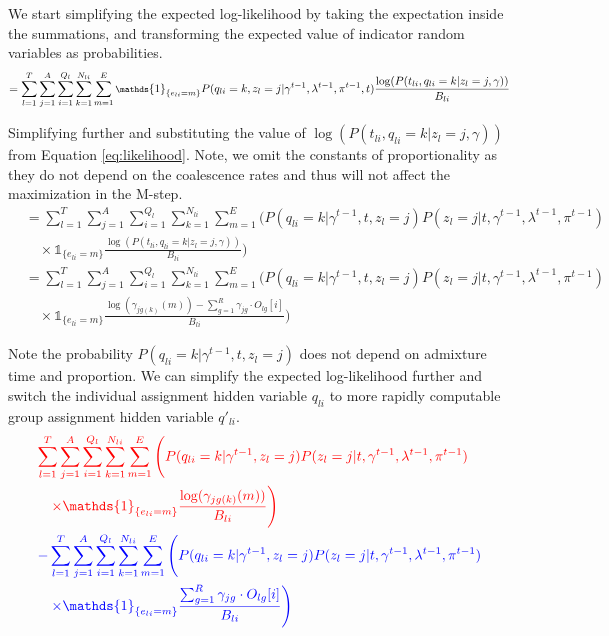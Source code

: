 We start simplifying the expected log-likelihood by taking the expectation inside the summations, and transforming the expected value of indicator random variables as probabilities.  
\begin{equation}
    \footnotesize
    = \sum_{l = 1}^T \sum_{j = 1}^A  \sum_{i = 1}^{Q_l} \sum_{k =1}^{N_{li}} \sum_{m = 1}^E \mathds{1}_{\{e_{l i} = m\}} P(q_{li} = k, z_l = j \vert \gamma^{t-1}, \lambda^{t-1}, \pi^{t-1}, t) \frac{\log(P(t_{li}, q_{l i} = k \vert z_l = j, \gamma ))}{B_{li}}
\end{equation}

Simplifying further and substituting the value of $\log(P( t_{li}, q_{l i} = k  \vert z_l = j, \gamma ))$ from Equation \ref{eq:likelihood}. Note, we omit the constants of proportionality as they do not depend on the coalescence rates and thus will not affect the maximization in the M-step.
\begin{align}
    &= \sum_{l = 1}^T \sum_{j = 1}^A \sum_{i = 1}^{Q_l} \sum_{k = 1}^{N_{li}} \sum_{m = 1}^E \Bigg( 
        P(q_{li} = k \vert \gamma^{t-1}, t, z_l = j) P(z_l = j \vert t, \gamma^{t-1}, \lambda^{t-1}, \pi^{t-1}) \nonumber \\
    &\quad \times \mathds{1}_{\{e_{l i} = m\}} \frac{\log(P(t_{li}, q_{l i} = k \vert z_l = j, \gamma))}{B_{li}} \Bigg) \nonumber \\
    &= \sum_{l = 1}^T \sum_{j = 1}^A \sum_{i = 1}^{Q_l} \sum_{k = 1}^{N_{li}} \sum_{m = 1}^E \Bigg( 
        P(q_{li} = k \vert \gamma^{t-1}, t, z_l = j) P(z_l = j \vert t, \gamma^{t-1}, \lambda^{t-1}, \pi^{t-1}) \nonumber \\
    &\quad \times \mathds{1}_{\{e_{l i} = m\}} \frac{\log(\gamma_{jg(k)}(m)) - \sum_{g=1}^R \gamma_{jg} \cdot O_{lg}[i]}{B_{li}} \Bigg) 
\end{align}

Note the probability $P(q_{li} = k \vert \gamma^{t-1}, t, z_l = j)$ does not depend on admixture time and proportion. We can simplify the expected log-likelihood further and switch the individual assignment hidden variable $q_{li}$ to more rapidly computable group assignment hidden variable $q'_{li}$. 
\begin{align}
   &\color{red}{\sum_{l = 1}^T \sum_{j = 1}^A \sum_{i = 1}^{Q_l} \sum_{k = 1}^{N_{li}} \sum_{m = 1}^E \Bigg( 
       P(q_{li} = k \vert \gamma^{t-1}, z_l = j) P(z_l = j \vert t, \gamma^{t-1}, \lambda^{t-1}, \pi^{t-1})} \nonumber \\
   &\quad \color{red}{\times \mathds{1}_{\{e_{l i} = m\}} \frac{\log(\gamma_{jg(k)}(m))}{B_{li}} \Bigg)} \nonumber \\
   &\color{blue}{- \sum_{l = 1}^T \sum_{j = 1}^A \sum_{i = 1}^{Q_l} \sum_{k = 1}^{N_{li}} \sum_{m = 1}^E \Bigg( 
       P(q_{li} = k \vert \gamma^{t-1}, z_l = j) P(z_l = j \vert t, \gamma^{t-1}, \lambda^{t-1}, \pi^{t-1})} \nonumber \\
   &\quad \color{blue}{\times \mathds{1}_{\{e_{l i} = m\}} \frac{\sum_{g=1}^R \gamma_{jg} \cdot O_{lg}[i]}{B_{li}} \Bigg)}
\end{align}


